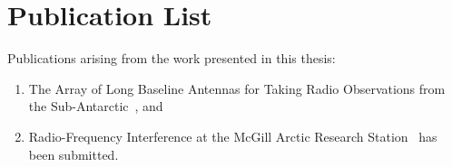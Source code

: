 \section*{Publication List}

Publications arising from the work presented in this thesis:

\begin{enumerate}
	\item The Array of Long Baseline Antennas for Taking Radio Observations from the Sub-Antarctic~\citep{2020arXiv200812208C}, and 
	\item Radio-Frequency Interference at the McGill Arctic Research Station~\citep{2020arXiv201206521D} has been submitted.
\end{enumerate}



